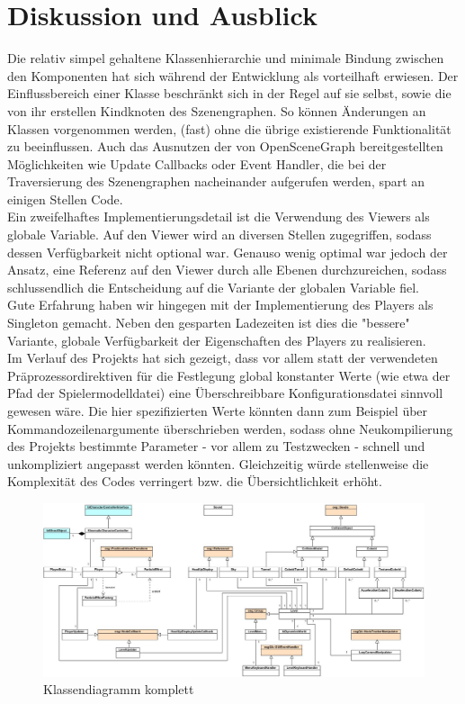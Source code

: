 \documentclass{llncs}
\begin{document}
\section{Diskussion und Ausblick}
Die relativ simpel gehaltene Klassenhierarchie und minimale Bindung zwischen den Komponenten hat sich w\"ahrend der Entwicklung als
vorteilhaft erwiesen. Der Einflussbereich einer Klasse beschr\"ankt sich in der Regel auf sie selbst, sowie die von ihr erstellen
Kindknoten des Szenengraphen. So k\"onnen \"Anderungen an Klassen vorgenommen werden, (fast) ohne die \"ubrige existierende Funktionalit\"at
zu beeinflussen. Auch das Ausnutzen der von OpenSceneGraph bereitgestellten M\"oglichkeiten wie Update Callbacks oder Event Handler, die
bei der Traversierung des Szenengraphen nacheinander aufgerufen werden, spart an einigen Stellen Code.\\
Ein zweifelhaftes Implementierungsdetail ist die Verwendung des Viewers als globale Variable. Auf den Viewer wird an diversen Stellen
zugegriffen, sodass dessen Verf\"ugbarkeit nicht optional war. Genauso wenig optimal war jedoch der Ansatz, eine Referenz auf den
Viewer durch alle Ebenen durchzureichen, sodass schlussendlich die Entscheidung auf die Variante der globalen Variable fiel.\\
Gute Erfahrung haben wir hingegen mit der Implementierung des Players als Singleton gemacht. Neben den gesparten Ladezeiten ist dies
die "bessere" Variante, globale Verf\"ugbarkeit der Eigenschaften des Players zu realisieren.\\
Im Verlauf des Projekts hat sich gezeigt, dass vor allem statt der verwendeten Pr\"aprozessordirektiven f\"ur die Festlegung global
konstanter Werte (wie etwa der Pfad der Spielermodelldatei) eine \"Uberschreibbare Konfigurationsdatei sinnvoll gewesen w\"are.
Die hier spezifizierten Werte k\"onnten dann zum Beispiel \"uber Kommandozeilenargumente \"uberschrieben werden, sodass ohne
Neukompilierung des Projekts bestimmte Parameter - vor allem zu Testzwecken - schnell und unkompliziert angepasst werden k\"onnten.
Gleichzeitig w\"urde stellenweise die Komplexit\"at des Codes verringert bzw. die \"Ubersichtlichkeit erh\"oht.


\newpage

\begin{figure}[ht]
	\centering
	\includegraphics[width=1.6\textwidth, angle=-90]{All.jpg}
	\caption{Klassendiagramm komplett}
\end{figure}
\end{document}
